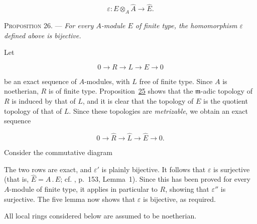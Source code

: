 \begin{equation*}
\varepsilon:E\otimes_A\widehat{A}\longrightarrow\widehat{E}.
\end{equation*}

\textsc{Proposition 26}. --- \emph{For every
$A$-module $E$ of finite type, the homomorphism $\varepsilon$ defined above is
bijective.}

Let

\begin{equation*}
0\longrightarrow R\longrightarrow L\longrightarrow E\longrightarrow0
\end{equation*}

be an exact sequence of $A$-modules, with $L$ free of finite type. Since $A$
is noetherian, $R$ is of finite type. Proposition~\hyperref[gaga:prop:25]{25}
shows that the $\mathfrak{m}$-adic topology of $R$ is induced by that of $L$,
and it is clear that the topology of $E$ is the quotient topology of that of
$L$. Since these topologies are \emph{metrizable}, we obtain an exact sequence

\begin{equation*}
0\longrightarrow\widehat{R}\longrightarrow\widehat{L}
\longrightarrow\widehat{E}\longrightarrow0.
\end{equation*}

Consider the commutative diagram

\begin{center}
\end{center}

The two rows are exact, and $\varepsilon'$ is plainly bijective. It follows
that $\varepsilon$ is surjective (that is,
$\widehat{E}=\widehat{A}\mathbin{.}E$; cf. , p.~153, Lemma~1). Since this
has been proved for every $A$-module of finite type, it applies in particular
to $R$, showing that $\varepsilon''$ is surjective. The five lemma now shows
that $\varepsilon$ is bijective, as required.


All local rings considered below are assumed to be noetherian.

